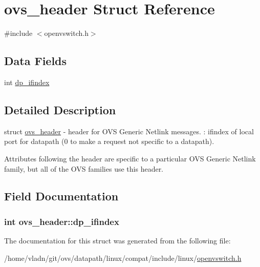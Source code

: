 \hypertarget{structovs__header}{}\section{ovs\+\_\+header Struct Reference}
\label{structovs__header}


{\ttfamily \#include $<$openvswitch.\+h$>$}

\subsection*{Data Fields}
\begin{DoxyCompactItemize}
\item 
int \hyperlink{structovs__header_a8ff8d9e5f29285dff5404cc8fa23b452}{dp\+\_\+ifindex}
\end{DoxyCompactItemize}


\subsection{Detailed Description}
struct \hyperlink{structovs__header}{ovs\+\_\+header} -\/ header for O\+V\+S Generic Netlink messages. \+: ifindex of local port for datapath (0 to make a request not specific to a datapath).

Attributes following the header are specific to a particular O\+V\+S Generic Netlink family, but all of the O\+V\+S families use this header. 

\subsection{Field Documentation}
\hypertarget{structovs__header_a8ff8d9e5f29285dff5404cc8fa23b452}{}
\subsubsection[{dp\+\_\+ifindex}]{\setlength{\rightskip}{0pt plus 5cm}int ovs\+\_\+header\+::dp\+\_\+ifindex}\label{structovs__header_a8ff8d9e5f29285dff5404cc8fa23b452}


The documentation for this struct was generated from the following file\+:\begin{DoxyCompactItemize}
\item 
/home/vladn/git/ovs/datapath/linux/compat/include/linux/\hyperlink{openvswitch_8h}{openvswitch.\+h}\end{DoxyCompactItemize}
